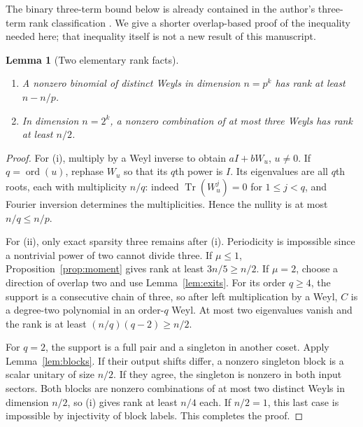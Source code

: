 \documentclass[11pt,a4paper]{article}
\newtheorem{lemma}[theorem]{Lemma}
\theoremstyle{remark}\newtheorem{remark}[theorem]{Remark}
\DeclareMathOperator{\Tr}{Tr}
\DeclareMathOperator{\ord}{ord}
\begin{document}
The binary three-term bound below is already contained in the author's three-term rank classification \cite{three}. We give a shorter overlap-based proof of the inequality needed here; that inequality itself is not a new result of this manuscript.

\begin{lemma}[Two elementary rank facts]\label{lem:small}
\begin{enumerate}
\item A nonzero binomial of distinct Weyls in dimension $n=p^k$ has rank at least $n-n/p$.
\item In dimension $n=2^k$, a nonzero combination of at most three Weyls has rank at least $n/2$.
\end{enumerate}
\end{lemma}
\begin{proof}
For (i), multiply by a Weyl inverse to obtain $aI+bW_u$, $u\ne0$. If $q=\ord(u)$, rephase $W_u$ so that its $q$th power is $I$. Its eigenvalues are all $q$th roots, each with multiplicity $n/q$: indeed $\Tr(W_u^j)=0$ for $1\le j<q$, and Fourier inversion determines the multiplicities. Hence the nullity is at most $n/q\le n/p$.

For (ii), only exact sparsity three remains after (i). Periodicity is impossible since a nontrivial power of two cannot divide three. If $\mu\le1$, Proposition~\ref{prop:moment} gives rank at least $3n/5\ge n/2$. If $\mu=2$, choose a direction of overlap two and use Lemma~\ref{lem:exits}. For its order $q\ge4$, the support is a consecutive chain of three, so after left multiplication by a Weyl, $C$ is a degree-two polynomial in an order-$q$ Weyl. At most two eigenvalues vanish and the rank is at least $(n/q)(q-2)\ge n/2$.

For $q=2$, the support is a full pair and a singleton in another coset. Apply Lemma~\ref{lem:blocks}. If their output shifts differ, a nonzero singleton block is a scalar unitary of size $n/2$. If they agree, the singleton is nonzero in both input sectors. Both blocks are nonzero combinations of at most two distinct Weyls in dimension $n/2$, so (i) gives rank at least $n/4$ each. If $n/2=1$, this last case is impossible by injectivity of block labels. This completes the proof.
\end{proof}
\end{document}
